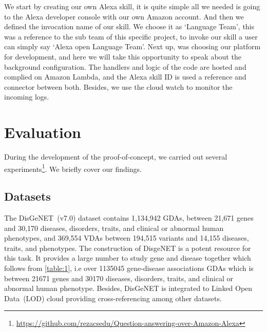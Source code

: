 \documentclass[10pt,journal,compsoc]{IEEEtran}
\begin{document}
We start by creating our own Alexa skill, it is quite simple all we needed is going to the Alexa developer console with our own Amazon account. And then we defined the invocation name of our skill. We choose it as ‘Language Team’, this was a reference to the sub team of this specific project, to invoke our skill a user can simply say ‘Alexa open Language Team’. Next up, was choosing our platform for development, and here we will take this opportunity to speak about the background configuration. The handlers and logic of the code are hosted and complied on Amazon Lambda, and the Alexa skill ID is used a reference and connector between both. Besides, we use the cloud watch to monitor the incoming logs. %

\section{Evaluation}\label{sec:results}
\noindent During the development of the proof-of-concept, we carried out several experiments\footnote{\url{https://github.com/rezacsedu/Question-answering-over-Amazon-Alexa}}. We briefly cover our findings. %

\subsection{Datasets} 
\noindent The DisGeNET~(v7.0) dataset contains 1,134,942 GDAs, between 21,671 genes and 30,170 diseases, disorders, traits, and clinical or abnormal human phenotypes, and 369,554 VDAs between 194,515 variants and 14,155 diseases, traits, and phenotypes. The construction of DisgeNET is a potent resource for this task. It provides a large number to study gene and disease together which follows from \cref{table:1}, i.e over 1135045 gene-disease associations GDAs which is between 21671 genes and 30170 diseases, disorders, traits, and clinical or abnormal human phenotype. Besides, DisGeNET is integrated to Linked Open Data~(LOD) cloud providing cross-referencing among other datasets.
\end{document}
